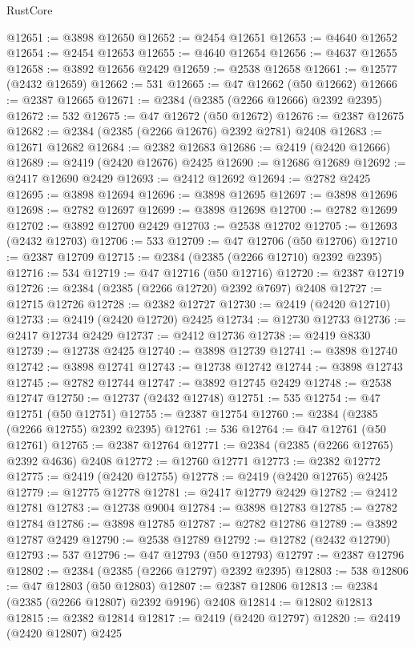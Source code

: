\begin{lexlean}{RustCore}
\begin{coremodule}
@12651 := @3898 @12650
@12652 := @2454 @12651
@12653 := @4640 @12652
@12654 := @2454 @12653
@12655 := @4640 @12654
@12656 := @4637 @12655
@12658 := @3892 @12656 @2429
@12659 := @2538 @12658
@12661 := @12577 (@2432 @12659)
@12662 := 531
@12665 := @47 @12662 (@50 @12662)
@12666 := @2387 @12665
@12671 := @2384 (@2385 (@2266 @12666) @2392 @2395)
@12672 := 532
@12675 := @47 @12672 (@50 @12672)
@12676 := @2387 @12675
@12682 := @2384 (@2385 (@2266 @12676) @2392 @2781) @2408
@12683 := @12671 @12682
@12684 := @2382 @12683
@12686 := @2419 (@2420 @12666)
@12689 := @2419 (@2420 @12676) @2425
@12690 := @12686 @12689
@12692 := @2417 @12690 @2429
@12693 := @2412 @12692
@12694 := @2782 @2425
@12695 := @3898 @12694
@12696 := @3898 @12695
@12697 := @3898 @12696
@12698 := @2782 @12697
@12699 := @3898 @12698
@12700 := @2782 @12699
@12702 := @3892 @12700 @2429
@12703 := @2538 @12702
@12705 := @12693 (@2432 @12703)
@12706 := 533
@12709 := @47 @12706 (@50 @12706)
@12710 := @2387 @12709
@12715 := @2384 (@2385 (@2266 @12710) @2392 @2395)
@12716 := 534
@12719 := @47 @12716 (@50 @12716)
@12720 := @2387 @12719
@12726 := @2384 (@2385 (@2266 @12720) @2392 @7697) @2408
@12727 := @12715 @12726
@12728 := @2382 @12727
@12730 := @2419 (@2420 @12710)
@12733 := @2419 (@2420 @12720) @2425
@12734 := @12730 @12733
@12736 := @2417 @12734 @2429
@12737 := @2412 @12736
@12738 := @2419 @8330
@12739 := @12738 @2425
@12740 := @3898 @12739
@12741 := @3898 @12740
@12742 := @3898 @12741
@12743 := @12738 @12742
@12744 := @3898 @12743
@12745 := @2782 @12744
@12747 := @3892 @12745 @2429
@12748 := @2538 @12747
@12750 := @12737 (@2432 @12748)
@12751 := 535
@12754 := @47 @12751 (@50 @12751)
@12755 := @2387 @12754
@12760 := @2384 (@2385 (@2266 @12755) @2392 @2395)
@12761 := 536
@12764 := @47 @12761 (@50 @12761)
@12765 := @2387 @12764
@12771 := @2384 (@2385 (@2266 @12765) @2392 @4636) @2408
@12772 := @12760 @12771
@12773 := @2382 @12772
@12775 := @2419 (@2420 @12755)
@12778 := @2419 (@2420 @12765) @2425
@12779 := @12775 @12778
@12781 := @2417 @12779 @2429
@12782 := @2412 @12781
@12783 := @12738 @9004
@12784 := @3898 @12783
@12785 := @2782 @12784
@12786 := @3898 @12785
@12787 := @2782 @12786
@12789 := @3892 @12787 @2429
@12790 := @2538 @12789
@12792 := @12782 (@2432 @12790)
@12793 := 537
@12796 := @47 @12793 (@50 @12793)
@12797 := @2387 @12796
@12802 := @2384 (@2385 (@2266 @12797) @2392 @2395)
@12803 := 538
@12806 := @47 @12803 (@50 @12803)
@12807 := @2387 @12806
@12813 := @2384 (@2385 (@2266 @12807) @2392 @9196) @2408
@12814 := @12802 @12813
@12815 := @2382 @12814
@12817 := @2419 (@2420 @12797)
@12820 := @2419 (@2420 @12807) @2425

\end{coremodule}
\end{lexlean}
